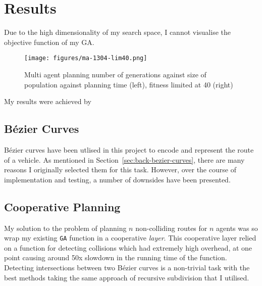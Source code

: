 \section{Results}

Due to the high dimensionality of my search space, I cannot visualise the objective function of my GA.

\begin{figure}[ht]
  \centering
  \texttt{[image: figures/ma-1304-lim40.png]}
  \caption{\label{fig:ma-lim40} Multi agent planning number of generations against size of population against planning time (left), fitness limited at 40 (right)}
\end{figure}


My results were achieved by
\subsection{Bézier Curves}

Bézier curves have been utlised in this project to encode and represent the route of a vehicle. As mentioned in Section~\ref{sec:back-bezier-curves}, there are many reasons I originally selected them for this task. However, over the course of implementation and testing, a number of downsides have been presented.

\subsection{Cooperative Planning}
\label{subsec:eval-cooperativeplanning}

My solution to the problem of planning $n$ non-colliding routes for $n$ agents was so wrap my existing \texttt{GA} function in a cooperative \textit{layer}. This cooperative layer relied on a function for detecting collisions which had extremely high overhead, at one point causing around 50x slowdown in the running time of the function. Detecting intersections between two Bézier curves is a non-trivial task with the best methods taking the same approach of recursive subdivision that I utilised.





